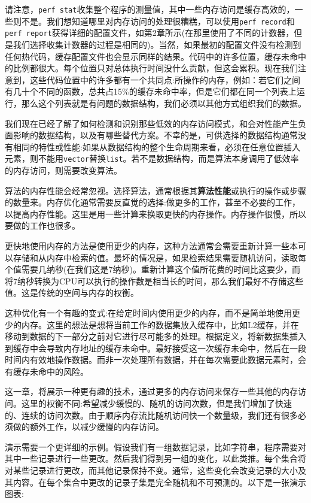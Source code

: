 请注意，\texttt{perf stat}收集整个程序的测量值，其中一些内存访问是缓存高效的，一些则不是。我们想知道哪里对内存访问的处理很糟糕，可以使用\texttt{perf record}和\texttt{perf report}获得详细的配置文件，如第2章所示(在那里使用了不同的计数器，但是我们选择收集计数器的过程是相同的)。当然，如果最初的配置文件没有检测到任何热代码，缓存配置文件也会显示同样的结果。代码中的许多位置，缓存未命中的比例都很大。每个位置只对总体执行时间没什么贡献，但这会累积。现在我们注意到，这些代码位置中的许多都有一个共同点:所操作的内存，例如：若它们之间有几十个不同的函数，总共占15\%的缓存未命中率，但是它们都在同一个列表上运行，那么这个列表就是有问题的数据结构，我们必须以其他方式组织我们的数据。

我们现在已经了解了如何检测和识别那些低效的内存访问模式，和会对性能产生负面影响的数据结构，以及有哪些替代方案。不幸的是，可供选择的数据结构通常没有相同的特性或性能:如果从数据结构的整个生命周期来看，必须在任意位置插入元素，则不能用\texttt{vector}替换\texttt{list}。若不是数据结构，而是算法本身调用了低效率的内存访问，则需要改变算法。


算法的内存性能会经常忽视。选择算法，通常根据其\textbf{算法性能}或执行的操作或步骤的数量来。内存优化通常需要反直觉的选择:做更多的工作，甚至不必要的工作，以提高内存性能。这里是用一些计算来换取更快的内存操作。内存操作很慢，所以要做的工作也很多。

更快地使用内存的方法是使用更少的内存，这种方法通常会需要重新计算一些本可以存储和从内存中检索的值。最坏的情况是，如果检索结果需要随机访问，读取每个值需要几纳秒(在我们这是7纳秒)。重新计算这个值所花费的时间比这要少，而将7纳秒转换为CPU可以执行的操作数是相当长的时间，那么我们最好不存储这些值。这是传统的空间与内存的权衡。

这种优化有一个有趣的变式:在给定时间内使用更少的内存，而不是简单地使用更少的内存。这里的想法是想将当前工作的数据集放入缓存中，比如L2缓存，并在移动到数据的下一部分之前对它进行尽可能多的处理。根据定义，将新数据集插入到缓存中会导致内存地址的缓存未命中。最好接受这一次缓存未命中，然后在一段时间内有效地操作数据。而非一次处理所有数据，并在每次需要此数据元素时，会有缓存未命中的风险。

这一章，将展示一种更有趣的技术，通过更多的内存访问来保存一些其他的内存访问。这里的权衡不同:希望减少缓慢的、随机的访问次数，但是我们增加了快速的、连续的访问次数。由于顺序内存流比随机访问快一个数量级，我们还有很多必须做的额外工作，以减少缓慢的内存访问。

演示需要一个更详细的示例。假设我们有一组数据记录，比如字符串，程序需要对其中一些记录进行一些更改。然后我们得到另一组的变化，以此类推。每个集合将对某些记录进行更改，而其他记录保持不变。通常，这些变化会改变记录的大小及其内容。在每个集合中更改的记录子集是完全随机和不可预测的。以下是一张演示图表:

